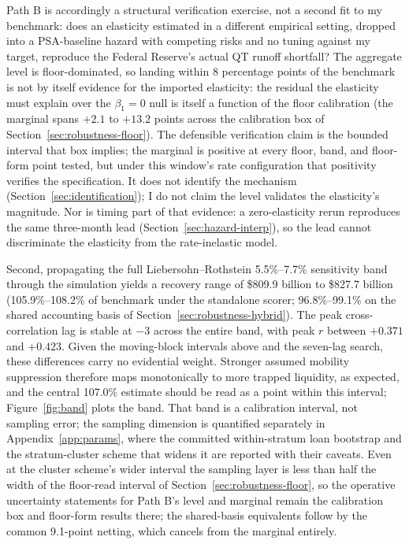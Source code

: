 \documentclass[12pt]{article}
\begin{document}
Path B is accordingly a structural verification exercise, not a second fit to my benchmark: does an elasticity estimated in a different empirical setting, dropped into a PSA-baseline hazard with competing risks and no tuning against my target, reproduce the Federal Reserve's actual QT runoff shortfall? The aggregate level is floor-dominated, so landing within 8 percentage points of the benchmark is not by itself evidence for the imported elasticity: the residual the elasticity must explain over the $\beta_1 = 0$ null is itself a function of the floor calibration (the marginal spans $+2.1$ to $+13.2$ points across the calibration box of Section~\ref{sec:robustness-floor}). The defensible verification claim is the bounded interval that box implies; the marginal is positive at every floor, band, and floor-form point tested, but under this window's rate configuration that positivity verifies the specification. It does not identify the mechanism (Section~\ref{sec:identification}); I do not claim the level validates the elasticity's magnitude. Nor is timing part of that evidence: a zero-elasticity rerun reproduces the same three-month lead (Section~\ref{sec:hazard-interp}), so the lead cannot discriminate the elasticity from the rate-inelastic model.

Second, propagating the full Liebersohn--Rothstein 5.5\%--7.7\% sensitivity band through the simulation yields a recovery range of \$809.9 billion to \$827.7 billion (105.9\%--108.2\% of benchmark under the standalone scorer; 96.8\%--99.1\% on the shared accounting basis of Section~\ref{sec:robustness-hybrid}). The peak cross-correlation lag is stable at $-3$ across the entire band, with peak $r$ between $+0.371$ and $+0.423$. Given the moving-block intervals above and the seven-lag search, these differences carry no evidential weight. Stronger assumed mobility suppression therefore maps monotonically to more trapped liquidity, as expected, and the central 107.0\% estimate should be read as a point within this interval; Figure~\ref{fig:band} plots the band. That band is a calibration interval, not sampling error; the sampling dimension is quantified separately in Appendix~\ref{app:params}, where the committed within-stratum loan bootstrap and the stratum-cluster scheme that widens it are reported with their caveats. Even at the cluster scheme's wider interval the sampling layer is less than half the width of the floor-read interval of Section~\ref{sec:robustness-floor}, so the operative uncertainty statements for Path B's level and marginal remain the calibration box and floor-form results there; the shared-basis equivalents follow by the common 9.1-point netting, which cancels from the marginal entirely.
\end{document}
